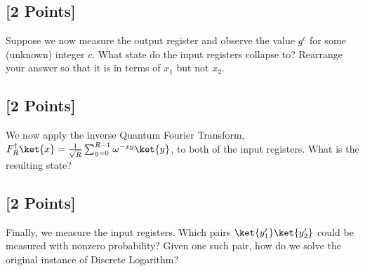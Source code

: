 \documentclass[11pt]{article}
\begin{document}
\subsection{[2 Points]} Suppose we now measure the output register and observe the value $g^c$ for some (unknown) integer $c$. What state do the input registers collapse to? Rearrange your answer so that it is in terms of $x_1$ but not $x_2$.




\subsection{[2 Points]} We now apply the inverse Quantum Fourier Transform, $F_R^\dagger\ket{x}=\frac{1}{\sqrt{R}} \sum_{y=0}^{R-1} \omega^{-xy}\ket{y}$, to both of the input registers. What is the resulting state?



\subsection{[2 Points]} Finally, we measure the input registers. Which pairs $\ket{y_1'}\ket{y_2'}$ could be measured with nonzero probability? Given one such pair, how do we solve the original instance of Discrete Logarithm?
\end{document}
